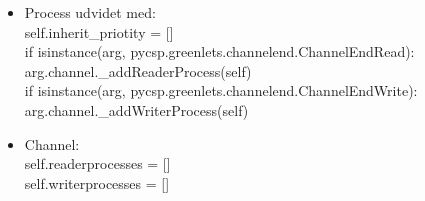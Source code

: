 \begin{itemize}
\tightlist
\item Process udvidet med: \\self.inherit\_priotity = []     \\
            if isinstance(arg, pycsp.greenlets.channelend.ChannelEndRead):\\
                arg.channel.\_addReaderProcess(self)\\
            if isinstance(arg, pycsp.greenlets.channelend.ChannelEndWrite):\\
                arg.channel.\_addWriterProcess(self)
\item Channel:\\
        self.readerprocesses = []\\
        self.writerprocesses = []
\end{itemize}
